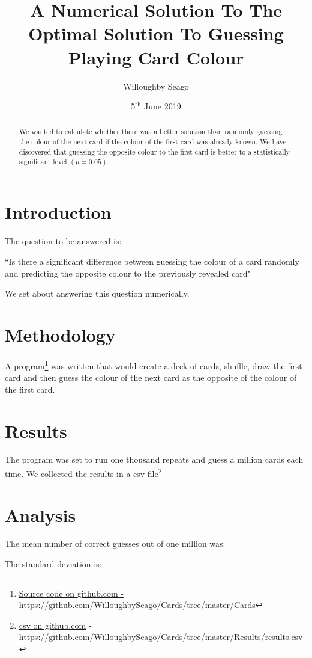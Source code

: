 \documentclass{article}
\date{5\(^\text{th}\) June 2019}
\author{Willoughby Seago}
\title{A Numerical Solution To The Optimal Solution To Guessing Playing Card Colour}
\begin{document}
	\maketitle
	\begin{abstract}
		We wanted to calculate whether there was a better solution than randomly guessing the colour of the next card if the colour of the first card was already known.
        We have discovered that guessing the opposite colour to the first card is better to a statistically significant level \((p=0.05)\).
	\end{abstract}
    \hspace{2em}
    \tableofcontents
    \section*{Introduction}
    The question to be answered is:
    
    ``Is there a significant difference between guessing the colour of a card randomly and predicting the opposite colour to the previously revealed card"
    
    We set about answering this question numerically.
    \section{Methodology}
    A program\footnote{\href{https://github.com/WilloughbySeago/Cards/tree/master/Cards}{Source code on github.com - }\url{https://github.com/WilloughbySeago/Cards/tree/master/Cards}} was written that would create a deck of cards, shuffle, draw the first card and then guess the colour of the next card as the opposite of the colour of the first card.
    \section{Results}
    The program was set to run one thousand repeats and guess a million cards each time.
    We collected the results in a csv file\footnote{\href{https://github.com/WilloughbySeago/Cards/tree/master/Results/results.csv}{csv on github.com} - \url{https://github.com/WilloughbySeago/Cards/tree/master/Results/results.csv}}
    \section{Analysis}
    The mean number of correct guesses out of one million was: %
    
    The standard deviation is: %
    
\end{document}
